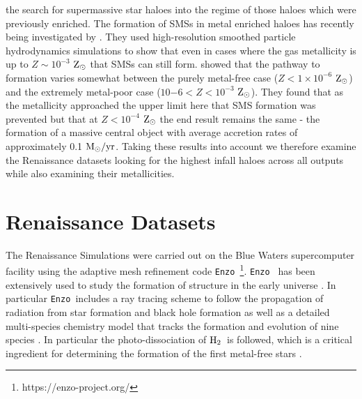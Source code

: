 \documentclass[graphics, twocolumn, usenatbib]{mn2e}
\newcommand{\enzo}{\texttt{Enzo~}}
\newcommand{\msolaryrc} {$\rm{M_{\odot}/yr}$}
\newcommand{\zsolar} {$\rm{Z_{\odot}}~$}
\newcommand{\zsolarc} {$\rm{Z_{\odot}}$}
\newcommand{\molH} {$\rm{H_2}$~}
\begin{document}
  the search for supermassive star haloes into the regime of those haloes which were previously
  enriched. The formation of SMSs in metal enriched haloes has recently being investigated by
  \cite{Chon_2020}. They used high-resolution smoothed particle hydrodynamics simulations to
  show that even in cases where the gas metallicity is up to $Z \sim 10^{-3}$ \zsolar that
  SMSs can still form. \cite{Chon_2020} showed that the pathway to formation varies
  somewhat between the purely metal-free case ($Z < 1 \times 10^{-6}$ \zsolarc) and the extremely metal-poor
  case  ($10{-6} <  Z < 10^{-3}$ \zsolarc). They found that as the 
  metallicity approached the upper limit here that SMS formation was prevented but that at $Z < 10^{-4}$ \zsolar the end result remains the same - the formation
  of a massive central object with average accretion rates of approximately 0.1 \msolaryrc.
  Taking these results into account we therefore examine the Renaissance datasets looking
  for the highest infall haloes across all outputs while also examining their metallicities. 

\section{Renaissance Datasets} \label{Sec:RenaissanceDatasets}
The Renaissance Simulations were carried out on the Blue Waters supercomputer facility using the
adaptive mesh refinement code \enzo\citep{Enzo_2014}\footnote{https://enzo-project.org/}. \enzo
has been extensively used to study the formation of structure in the early universe
\citep{Abel_2002, OShea_2005b, Turk_2012, Wise_2012b, Wise_2014, Regan_2015, Regan_2017}. In particular
\enzo includes a ray tracing scheme to follow the propagation of radiation from star formation and
black hole formation \citep{WiseAbel_2011} as well as a detailed multi-species chemistry model that
tracks the formation and evolution of nine species \citep{Anninos_1997, Abel_1997, Grackle}. In
particular the photo-dissociation of \molH is followed, which is a critical ingredient for
determining the formation of the first metal-free stars \citep{Abel_2000}. 
\end{document}
